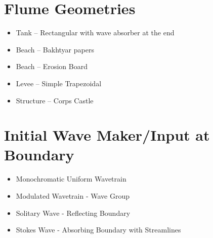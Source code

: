 \documentclass[letterpaper,12pt,english]{sphinxmanual}
\begin{document}
\section{Flume Geometries}
\label{index:flume-geometries}\begin{itemize}
\item {} 
Tank -- Rectangular with wave absorber at the end

\end{itemize}
\begin{itemize}
\item {} 
Beach -- Bakhtyar papers

\end{itemize}
\begin{itemize}
\item {} 
Beach -- Erosion Board

\end{itemize}
\begin{itemize}
\item {} 
Levee -- Simple Trapezoidal

\end{itemize}
\begin{itemize}
\item {} 
Structure -- Corps Castle

\end{itemize}


\section{Initial Wave Maker/Input at Boundary}
\label{index:initial-wave-maker-input-at-boundary}\begin{itemize}
\item {} 
Monochromatic Uniform Wavetrain

\end{itemize}
\begin{itemize}
\item {} 
Modulated Wavetrain - Wave Group

\end{itemize}
\begin{itemize}
\item {} 
Solitary Wave - Reflecting Boundary

\end{itemize}
\begin{itemize}
\item {} 
Stokes Wave - Absorbing Boundary with Streamlines

\end{itemize}
\end{document}
